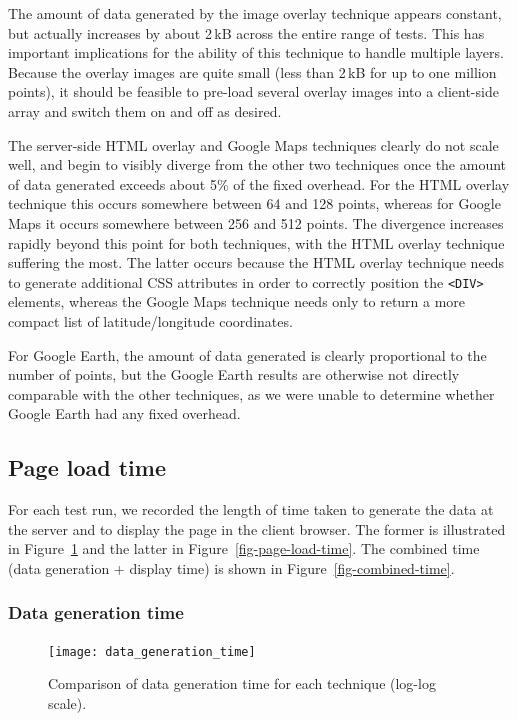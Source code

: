 \documentclass[acmtocl,acmnow]{acmtrans2m}
\begin{document}
The amount of data generated by the image overlay technique appears
constant, but actually increases by about 2\,kB across the entire range
of tests. This has important implications for the ability of this
technique to handle multiple layers. Because the overlay images are
quite small (less than 2\,kB for up to one million points), it should be
feasible to pre-load several overlay images into a client-side array and
switch them on and off as desired.

The server-side HTML overlay and Google Maps techniques clearly do not
scale well, and begin to visibly diverge from the other two techniques
once the amount of data generated exceeds about 5\% of the fixed
overhead. For the HTML overlay technique this occurs somewhere between
64 and 128 points, whereas for Google Maps it occurs somewhere between
256 and 512 points. The divergence increases rapidly beyond this point
for both techniques, with the HTML overlay technique suffering the most.
The latter occurs because the HTML overlay technique needs to generate
additional CSS attributes in order to correctly position the
\verb|<DIV>| elements, whereas the Google Maps technique needs only to
return a more compact list of latitude/longitude coordinates.

For Google Earth, the amount of data generated is clearly proportional
to the number of points, but the Google Earth results are otherwise not
directly comparable with the other techniques, as we were unable to
determine whether Google Earth had any fixed overhead.


\subsection{Page load time}

For each test run, we recorded the length of time taken to generate the
data at the server and to display the page in the client browser. The
former is illustrated in Figure~\ref{fig-data-generation-time} and the
latter in Figure~\ref{fig-page-load-time}. The combined time (data
generation + display time) is shown in Figure~\ref{fig-combined-time}.


\subsubsection{Data generation time}


\begin{figure}
	\texttt{[image: data\_generation\_time]}
	\caption{Comparison of data generation time for each technique (log-log scale).}
	\label{fig-data-generation-time}
\end{figure}
\end{document}
